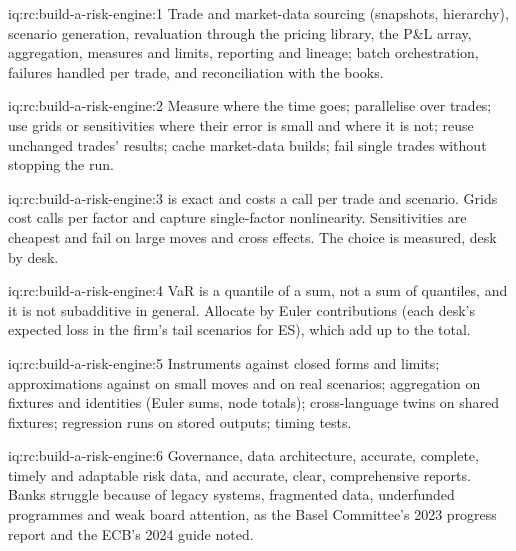 \begin{solution}{iq:rc:build-a-risk-engine:1}
Trade and market-data sourcing (snapshots, hierarchy), scenario generation, revaluation through the pricing
library, the P\&L array, aggregation, measures and limits, reporting and lineage; batch orchestration,
failures handled per trade, and reconciliation with the books.
\end{solution}

\begin{solution}{iq:rc:build-a-risk-engine:2}
Measure where the time goes; parallelise over trades; use grids or sensitivities where their error is small
and  where it is not; reuse unchanged trades' results; cache market-data builds; fail single
trades without stopping the run.
\end{solution}

\begin{solution}{iq:rc:build-a-risk-engine:3}
 is exact and costs a call per trade and scenario. Grids cost calls per factor and capture
single-factor nonlinearity. Sensitivities are cheapest and fail on large moves and cross effects. The choice
is measured, desk by desk.
\end{solution}

\begin{solution}{iq:rc:build-a-risk-engine:4}
VaR is a quantile of a sum, not a sum of quantiles, and it is not subadditive in general. Allocate by Euler
contributions (each desk's expected loss in the firm's tail scenarios for ES), which add up to the total.
\end{solution}

\begin{solution}{iq:rc:build-a-risk-engine:5}
Instruments against closed forms and limits; approximations against  on small moves and on
real scenarios; aggregation on fixtures and identities (Euler sums, node totals); cross-language twins on shared
fixtures; regression runs on stored outputs; timing tests.
\end{solution}

\begin{solution}{iq:rc:build-a-risk-engine:6}
Governance, data architecture, accurate, complete, timely and adaptable risk data, and accurate, clear,
comprehensive reports. Banks struggle because of legacy systems, fragmented data, underfunded programmes
and weak board attention, as the Basel Committee's 2023 progress report and the ECB's 2024 guide noted.
\end{solution}
